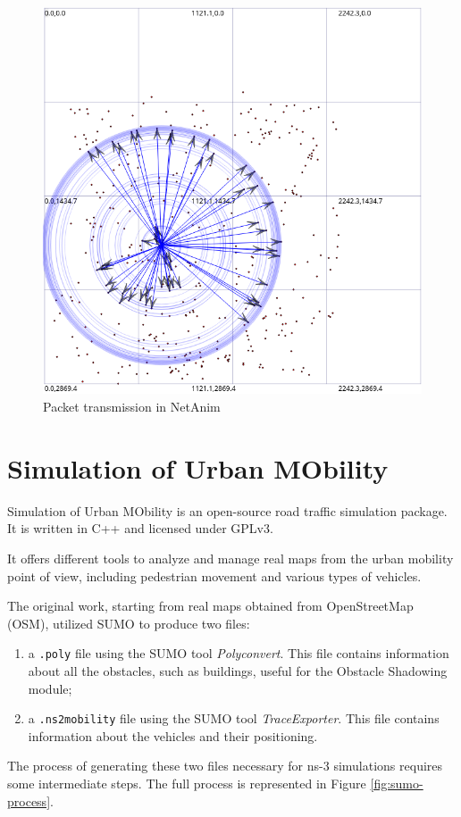 			\begin{figure}[H]
				\centering
				\includegraphics[scale=0.38]{immagini/netanim}
				\caption{Packet transmission in NetAnim}
				\label{fig:netanim}
			\end{figure}
	
	\section{Simulation of Urban MObility}
		\label{sec:sumo}
		Simulation of Urban MObility is an open-source road traffic simulation package. It is written in C++ and licensed under GPLv3. 
		
		
		It offers different tools to analyze and manage real maps from the urban mobility point of view, including pedestrian movement and various types of vehicles.
		
		
		The original work, starting from real maps obtained from OpenStreetMap (OSM), \cite{ROM2017} utilized SUMO to produce two files:
		\begin{enumerate}
			\item a \texttt{.poly} file using the SUMO tool \textit{Polyconvert}. This file contains information about all the obstacles, such as buildings, useful for the Obstacle Shadowing module;
			\item a \texttt{.ns2mobility} file using the SUMO tool \textit{TraceExporter}. This file contains information about the vehicles and their positioning. 
		\end{enumerate}
		The process of generating these two files necessary for ns-3 simulations requires some intermediate steps. The full process is represented in Figure \ref{fig:sumo-process}. 
		
